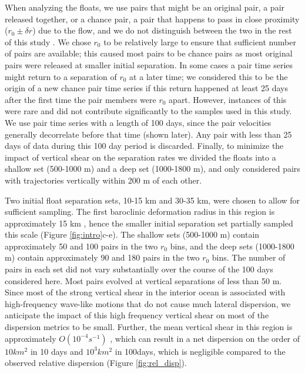 \documentclass[]{ametsoc}
\begin{document}
When analyzing the floats, we use pairs that might be an original pair, a pair released together, or a chance pair, a pair that happens to pass in close proximity ($r_0 \pm \delta r$) due to the flow, and we do not distinguish between the two in the rest of this study \citep{morel1974relative, lacasce2000relative}. We chose $r_0$ to be relatively large to ensure that sufficient number of pairs are available; this caused most pairs to be chance pairs as most original pairs were released at smaller initial separation. In some cases a pair time series might return to a separation of $r_0$ at a later time; we considered this to be the origin of a new chance pair time series if this return happened at least 25 days after the first time the pair members were $r_0$ apart. However, instances of this were rare and did not contribute significantly to the samples used in this study. 
We use pair time series with a length of 100 days, since the pair velocities generally decorrelate before that time (shown later).
Any pair with less than 25 days of data during this 100 day period is discarded. Finally, to minimize the impact of vertical shear on the separation rates we divided the floats into a shallow set (500-1000 m) and a deep set (1000-1800 m), and only considered pairs with trajectories vertically within 200 m of each other. 

Two initial float separation sets, 10-15 km and 30-35 km, were chosen to allow for sufficient sampling. The first baroclinic deformation radius in this region is approximately 15 km \citep{chelton1998geographical}, hence the smaller initial separation set partially sampled this scale (Figure \ref{fig:intro}c-e). The shallow sets (500-1000 m) contain approximately 50 and 100 pairs in the two $r_0$ bins, and the deep sets (1000-1800 m) contain approximately 90 and 180 pairs in the two $r_0$ bins. The number of pairs in each set did not vary substantially over the course of the 100 days considered here. Most pairs evolved at vertical separations of less than 50 m. Since most of the strong vertical shear in the interior ocean is associated with high-frequency wave-like motions that do not cause much lateral dispersion, we anticipate the impact of this high frequency vertical shear on most of the dispersion metrics to be small. Further, the mean vertical shear in this region is approximately $O(10^{-4}s^{-1})$ \citep{balwada2016b}, which can result in a net dispersion on the order of $10km^2$ in 10 days and $10^{3}km^2$ in 100days, which is negligible compared to the observed relative dispersion (Figure \ref{fig:rel_disp}).
\end{document}
